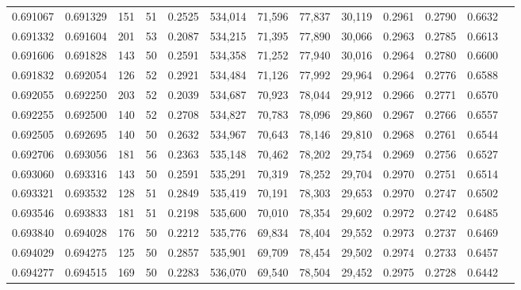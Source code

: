 \begin{tabular}{rrrrrrrrrrrrr}
0.691067 & 0.691329 &   151 &  51 &                                     0.2525 & 534,014 &  71,596 &  77,837 &  30,119 & 0.2961 & 0.2790 & 0.6632 \\
0.691332 & 0.691604 &   201 &  53 &                                     0.2087 & 534,215 &  71,395 &  77,890 &  30,066 & 0.2963 & 0.2785 & 0.6613 \\
0.691606 & 0.691828 &   143 &  50 &                                     0.2591 & 534,358 &  71,252 &  77,940 &  30,016 & 0.2964 & 0.2780 & 0.6600 \\
0.691832 & 0.692054 &   126 &  52 &                                     0.2921 & 534,484 &  71,126 &  77,992 &  29,964 & 0.2964 & 0.2776 & 0.6588 \\
0.692055 & 0.692250 &   203 &  52 &                                     0.2039 & 534,687 &  70,923 &  78,044 &  29,912 & 0.2966 & 0.2771 & 0.6570 \\
0.692255 & 0.692500 &   140 &  52 &                                     0.2708 & 534,827 &  70,783 &  78,096 &  29,860 & 0.2967 & 0.2766 & 0.6557 \\
0.692505 & 0.692695 &   140 &  50 &                                     0.2632 & 534,967 &  70,643 &  78,146 &  29,810 & 0.2968 & 0.2761 & 0.6544 \\
0.692706 & 0.693056 &   181 &  56 &                                     0.2363 & 535,148 &  70,462 &  78,202 &  29,754 & 0.2969 & 0.2756 & 0.6527 \\
0.693060 & 0.693316 &   143 &  50 &                                     0.2591 & 535,291 &  70,319 &  78,252 &  29,704 & 0.2970 & 0.2751 & 0.6514 \\
0.693321 & 0.693532 &   128 &  51 &                                     0.2849 & 535,419 &  70,191 &  78,303 &  29,653 & 0.2970 & 0.2747 & 0.6502 \\
0.693546 & 0.693833 &   181 &  51 &                                     0.2198 & 535,600 &  70,010 &  78,354 &  29,602 & 0.2972 & 0.2742 & 0.6485 \\
0.693840 & 0.694028 &   176 &  50 &                                     0.2212 & 535,776 &  69,834 &  78,404 &  29,552 & 0.2973 & 0.2737 & 0.6469 \\
0.694029 & 0.694275 &   125 &  50 &                                     0.2857 & 535,901 &  69,709 &  78,454 &  29,502 & 0.2974 & 0.2733 & 0.6457 \\
0.694277 & 0.694515 &   169 &  50 &                                     0.2283 & 536,070 &  69,540 &  78,504 &  29,452 & 0.2975 & 0.2728 & 0.6442 \\

\end{tabular}
